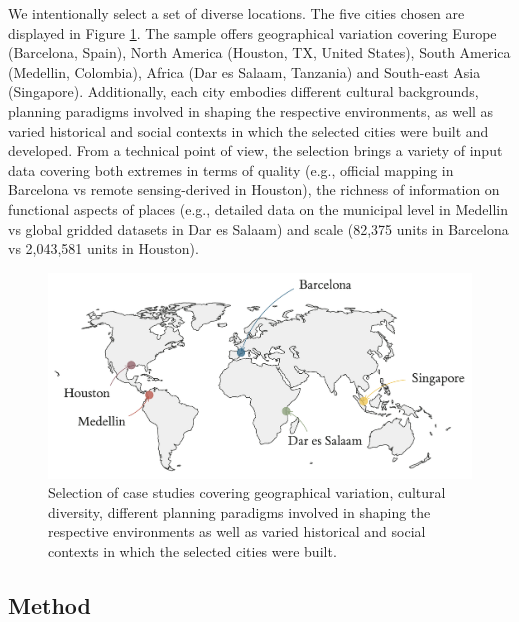 We intentionally select a set of diverse locations.
The five cities chosen are displayed in Figure \ref{fig:world_map}.
The sample offers geographical variation covering Europe (Barcelona, Spain), North
America (Houston, TX, United States), South America (Medellin, Colombia), Africa (Dar es
Salaam, Tanzania) and South-east Asia (Singapore).
Additionally, each city embodies different
cultural backgrounds, planning paradigms involved in shaping the
respective environments, as well as varied historical and social contexts in which the
selected cities were built and developed.
From a technical point of view, the selection brings a variety of input data covering both extremes in
terms of quality (e.g., official mapping in Barcelona vs remote sensing-derived in Houston), the
richness of information on functional aspects of places (e.g., detailed data on the
municipal level in Medellin vs global gridded datasets in Dar es Salaam) and scale
(82,375 units in Barcelona vs 2,043,581 units in Houston).

\begin{figure}
    \includegraphics[width=0.75\linewidth, center]{figures/examples_map.pdf}
    \caption{Selection of case studies covering geographical variation,
    cultural diversity, different planning paradigms involved in shaping the
    respective environments as well as varied historical and social contexts in which the
    selected cities were built.}
    \label{fig:world_map}
\end{figure}

\subsection{Method}

